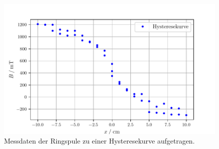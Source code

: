 \begin{figure}
  \centering
  \includegraphics[width=\textwidth]{build/Hysteresekurve.pdf}
  \caption{Messdaten der Ringspule zu einer Hysteresekurve aufgetragen.}\label{fig:hysterese}
\end{figure}


